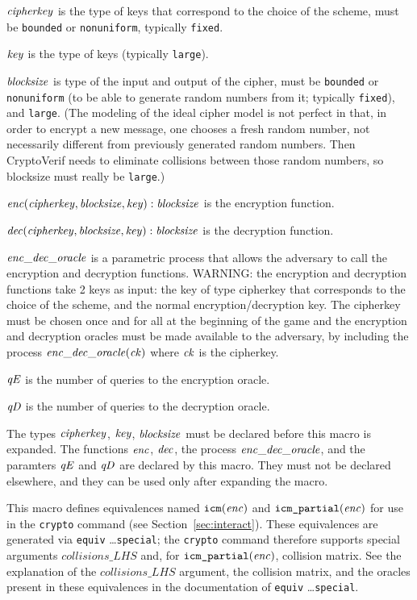 \documentclass{article}
\begin{document}
\begin{itemize}
   $\mathit{cipherkey}$ is the type of keys that correspond to the choice of the scheme, must be \texttt{bounded} or \texttt{nonuniform}, typically \texttt{fixed}.

   $\mathit{key}$ is the type of keys (typically \texttt{large}).

   $\mathit{blocksize}$ is type of the input and output of the cipher, 
   must be \texttt{bounded} or \texttt{nonuniform} (to be able to 
   generate random numbers from it; typically \texttt{fixed}), and \texttt{large}.
   (The modeling of the ideal cipher model is not perfect in that, in
   order to encrypt a new message, one chooses a fresh random number,
   not necessarily different from previously generated random
   numbers. Then CryptoVerif needs to eliminate collisions between
   those random numbers, so blocksize must really be \texttt{large}.)

   $\mathit{enc}(\mathit{cipherkey}, \mathit{blocksize}, \mathit{key}): \mathit{blocksize}$ is the encryption function.

   $\mathit{dec}(\mathit{cipherkey}, \mathit{blocksize}, \mathit{key}): \mathit{blocksize}$ is the decryption function.

   $\mathit{enc\_dec\_oracle}$ is a parametric process that allows the adversary to
   call the encryption and decryption functions.
   WARNING: the encryption and decryption functions take 2 keys as
   input: the key of type cipherkey that corresponds to the choice of
   the scheme, and the normal encryption/decryption key. The cipherkey
   must be chosen once and for all at the beginning of the game and
   the encryption and decryption oracles must be made available to the
   adversary, by including the process $\mathit{enc\_dec\_oracle}(\mathit{ck})$
   where $\mathit{ck}$ is the cipherkey.

   $\mathit{qE}$ is the number of queries to the encryption oracle.

   $\mathit{qD}$ is the number of queries to the decryption oracle.
 
   The types $\mathit{cipherkey}$, $\mathit{key}$, $\mathit{blocksize}$ must be
   declared before this macro is expanded. The functions $\mathit{enc}$,
   $\mathit{dec}$, the process $\mathit{enc\_dec\_oracle}$, and the paramters 
   $\mathit{qE}$ and $\mathit{qD}$ are declared by this macro. They must not be declared
   elsewhere, and they can be used only after expanding the macro.

   This macro defines equivalences named $\texttt{icm}(\mathit{enc})$ and $\texttt{icm\_partial}(\mathit{enc})$
   for use in the \texttt{crypto} command 
   (see Section~\ref{sec:interact}). These equivalences are generated via \texttt{equiv} \dots \texttt{special};
   the \texttt{crypto} command therefore supports special arguments $\mathit{collisions\_LHS}$ and, 
   for $\texttt{icm\_partial}(\mathit{enc})$, collision matrix. See the explanation of the $\mathit{collisions\_LHS}$
   argument, the collision matrix, and the oracles present in these equivalences in the documentation of \texttt{equiv} \dots \texttt{special}.


\end{itemize}
\end{document}

